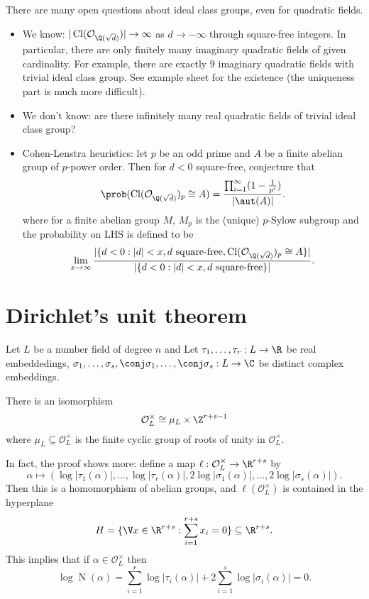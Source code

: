 \documentclass[a4paper]{article}
\renewcommand*{\O}{\mathcal{O}}
\DeclareMathOperator{\n}{N}
\DeclareMathOperator{\Cl}{Cl}%
\begin{document}
\begin{remark}
  There are many open questions about ideal class groups, even for quadratic fields.
  \begin{itemize}
  \item We know: \(|\Cl(\O_{\Q(\sqrt d)})| \to \infty\) as \(d \to -\infty\) through square-free integers. In particular, there are only finitely many imaginary quadratic fields of given cardinality. For example, there are exactly \(9\) imaginary quadratic fields with trivial ideal class group. See example sheet for the existence (the uniqueness part is much more difficult).
  \item We don't know: are there infinitely many real quadratic fields of trivial ideal class group?
  \item Cohen-Lenstra heuristics: let \(p\) be an odd prime and \(A\) be a finite abelian group of \(p\)-power order. Then for \(d < 0\) square-free, conjecture that
    \[
      \prob(\Cl(\O_{\Q(\sqrt d)})_p \cong A) = \frac{\prod_{i = 1}^\infty (1 - \frac{1}{p^i})}{|\aut(A)|}.
      \]
      where for a finite abelian group \(M\), \(M_p\) is the (unique) \(p\)-Sylow subgroup and the probability on LHS is defined to be
      \[
        \lim_{x \to \infty} \frac{|\{ d < 0: |d| < x, d \text{ square-free}, \Cl(\O_{\Q(\sqrt d)})_p \cong A \}|}{|\{ d < 0: |d| < x, d \text{ square-free} \}|}.
      \]
  \end{itemize}
\end{remark}

\section{Dirichlet's unit theorem}

Let \(L\) be a number field of degree \(n\) and Let \(\tau_1, \dots, \tau_r: L \to \R\) be real embeddedings, \(\sigma_1, \dots, \sigma_s, \conj \sigma_1, \dots, \conj \sigma_s: L \to \C\) be distinct complex embeddings.

\begin{theorem}
  \label{thm:Dirichlet unit}
  There is an isomorphism
  \[
    \O_L^\times \cong \mu_L \times \Z^{r + s - 1}
  \]
  where \(\mu_L \subseteq \O_L^\times\) is the finite cyclic group of roots of unity in \(\O_L^\times\).
\end{theorem}

In fact, the proof shows more: define a map \(\ell: \O_L^\times \to \R^{r + s}\) by
\[
  \alpha \mapsto (\log |\tau_1(\alpha)|, \dots, \log |\tau_r(\alpha)|, 2\log |\sigma_1(\alpha)|, \dots, 2\log |\sigma_s(\alpha)|).
\]
Then this is a homomorphism of abelian groups, and \(\ell(\O_L^\times)\) is contained in the hyperplane
\[
  H = \{ \V x \in \R^{r + s}: \sum_{i = 1}^{r + s} x_i = 0\} \subseteq \R^{r + s}.
\]
This implies that if \(\alpha \in \O_L^\times\) then
\[
  \log \n(\alpha) = \sum_{i = 1}^r \log |\tau_i(\alpha)| + 2 \sum_{i = 1}^s \log |\sigma_i(\alpha)| = 0.
\]
\end{document}
